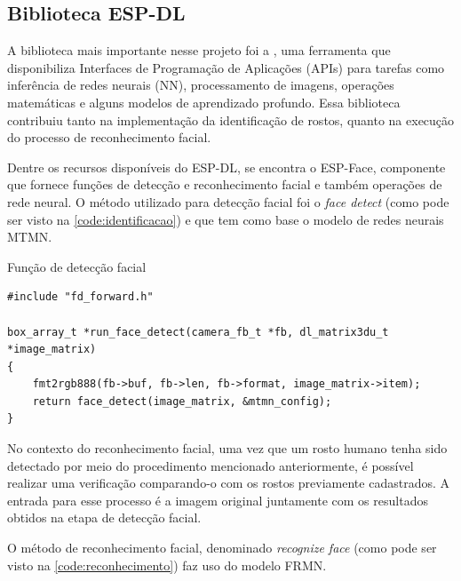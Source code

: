 \subsection{Biblioteca ESP-DL}\label{sec:formatacaoTexto}

A biblioteca mais importante nesse projeto foi a , 
uma ferramenta que disponibiliza Interfaces de Programação de Aplicações 
(APIs) para tarefas como inferência de redes neurais (NN), 
processamento de imagens, operações matemáticas 
e alguns modelos de aprendizado profundo. Essa biblioteca 
contribuiu tanto na implementação da identificação de rostos, 
quanto na execução do processo de reconhecimento facial.

Dentre os recursos disponíveis do ESP-DL, se encontra o 
ESP-Face, componente que fornece funções de detecção e 
reconhecimento facial e também operações de rede neural. 
O método utilizado para detecção facial foi o \textit{face detect} 
(como pode ser visto na \autoref{code:identificacao}) 
e que tem como base o modelo de redes neurais MTMN.

\begin{sourcecode}[htb]
\caption{\label{code:identificacao}Função de detecção facial}
\begin{lstlisting}[frame=single]
#include "fd_forward.h"

box_array_t *run_face_detect(camera_fb_t *fb, dl_matrix3du_t *image_matrix)
{
    fmt2rgb888(fb->buf, fb->len, fb->format, image_matrix->item);
    return face_detect(image_matrix, &mtmn_config);
}    
\end{lstlisting}
\fonte{}
\end{sourcecode}

No contexto do reconhecimento facial, uma vez que um rosto 
humano tenha sido detectado por meio do procedimento 
mencionado anteriormente, é possível realizar uma verificação 
comparando-o com os rostos previamente cadastrados. 
A entrada para esse processo é a imagem original juntamente 
com os resultados obtidos na etapa de detecção facial.

O método de reconhecimento facial, denominado \textit{recognize face}  
(como pode ser visto na \autoref{code:reconhecimento}) 
faz uso do modelo FRMN.

